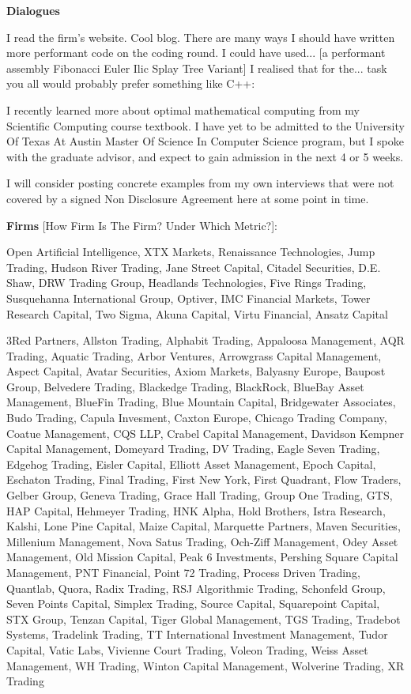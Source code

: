 \newpage

\textbf{Dialogues}

I read the firm's website. Cool blog. There are many ways I should have written more performant code on the coding round. I could have used... [a performant assembly Fibonacci Euler Ilic Splay Tree Variant] I realised that for the... task you all would probably prefer something like C++:

I recently learned more about optimal mathematical computing from my Scientific Computing course textbook. I have yet to be admitted to the University Of Texas At Austin Master Of Science In Computer Science program, but I spoke with the graduate advisor, and expect to gain admission in the next 4 or 5 weeks.

I will consider posting concrete examples from my own interviews that were not covered by a signed Non Disclosure Agreement here at some point in time.

\newpage

\textbf{Firms} [How Firm Is The Firm? Under Which Metric?]:

Open Artificial Intelligence, XTX Markets, Renaissance Technologies, Jump Trading, Hudson River Trading, Jane Street Capital, Citadel Securities, D.E. Shaw, DRW Trading Group, Headlands Technologies, Five Rings Trading, Susquehanna International Group, Optiver, IMC Financial Markets, Tower Research Capital, Two Sigma, Akuna Capital, Virtu Financial, Ansatz Capital

3Red Partners, Allston Trading, Alphabit Trading, Appaloosa Management, AQR Trading, Aquatic Trading, Arbor Ventures, Arrowgrass Capital Management, Aspect Capital, Avatar Securities, Axiom Markets, Balyasny Europe, Baupost Group, Belvedere Trading, Blackedge Trading, BlackRock, BlueBay Asset Management, BlueFin Trading, Blue Mountain Capital, Bridgewater Associates, Budo Trading, Capula Invesment, Caxton Europe, Chicago Trading Company, Coatue Management, CQS LLP, Crabel Capital Management, Davidson Kempner Capital Management, Domeyard Trading, DV Trading, Eagle Seven Trading, Edgehog Trading, Eisler Capital, Elliott Asset Management, Epoch Capital, Eschaton Trading, Final Trading, First New York, First Quadrant, Flow Traders, Gelber Group, Geneva Trading, Grace Hall Trading, Group One Trading, GTS, HAP Capital, Hehmeyer Trading, HNK Alpha, Hold Brothers, Istra Research, Kalshi, Lone Pine Capital, Maize Capital, Marquette Partners, Maven Securities, Millenium Management, Nova Satus Trading, Och-Ziff Management, Odey Asset Management, Old Mission Capital, Peak 6 Investments, Pershing Square Capital Management, PNT Financial, Point 72 Trading, Process Driven Trading, Quantlab, Quora, Radix Trading, RSJ Algorithmic Trading, Schonfeld Group, Seven Points Capital, Simplex Trading, Source Capital, Squarepoint Capital, STX Group, Tenzan Capital, Tiger Global Management, TGS Trading, Tradebot Systems, Tradelink Trading, TT International Investment Management, Tudor Capital, Vatic Labs, Vivienne Court Trading, Voleon Trading, Weiss Asset Management, WH Trading, Winton Capital Management, Wolverine Trading, XR Trading

